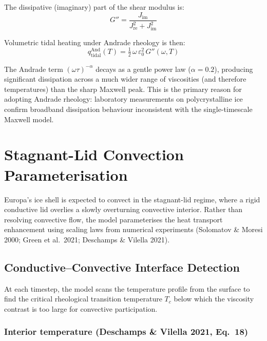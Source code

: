\documentclass[11pt,a4paper]{article}
\begin{document}
The dissipative (imaginary) part of the shear modulus is:
\begin{equation}
G'' = \frac{J_{\mathrm{im}}}{J_{\mathrm{re}}^2 + J_{\mathrm{im}}^2}
\label{eq:Gimag}
\end{equation}

Volumetric tidal heating under Andrade rheology is then:
\begin{equation}
q_{\mathrm{tidal}}^{\mathrm{And}}(T) = \tfrac{1}{2}\,\omega\,
  \varepsilon_0^2\,G''(\omega, T)
\label{eq:andrade_heating}
\end{equation}

The Andrade term $(\omega\tau)^{-\alpha}$ decays as a gentle power law
($\alpha = 0.2$), producing significant dissipation across a much wider
range of viscosities (and therefore temperatures) than the sharp Maxwell
peak. This is the primary reason for adopting Andrade rheology: laboratory
measurements on polycrystalline ice confirm broadband dissipation
behaviour inconsistent with the single-timescale Maxwell model.

\section{Stagnant-Lid Convection Parameterisation}
\label{sec:convection}

Europa's ice shell is expected to convect in the stagnant-lid regime,
where a rigid conductive lid overlies a slowly overturning convective
interior. Rather than resolving convective flow, the model parameterises
the heat transport enhancement using scaling laws from numerical
experiments (Solomatov \& Moresi 2000; Green et al.\ 2021;
Deschamps \& Vilella 2021).

\subsection{Conductive--Convective Interface Detection}

At each timestep, the model scans the temperature profile from the
surface to find the critical rheological transition temperature $T_c$
below which the viscosity contrast is too large for convective
participation.

\subsubsection{Interior temperature (Deschamps \& Vilella 2021, Eq.~18)}
\end{document}
